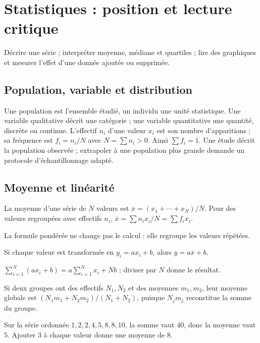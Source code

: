 \documentclass[../cours_2de.tex]{subfiles}
\begin{document}
\setcounter{chapter}{17}
\chapter{Statistiques : position et lecture critique}
\label{sec:ch18}
\begin{objectif}
Décrire une série ; interpréter moyenne, médiane et quartiles ; lire des graphiques et mesurer l'effet d'une donnée ajoutée ou supprimée.
\end{objectif}
\section{Population, variable et distribution}
Une population est l'ensemble étudié, un individu une unité statistique.
Une variable qualitative décrit une catégorie ; une variable quantitative une quantité, discrète ou continue.
L'effectif $n_i$ d'une valeur $x_i$ est son nombre d'apparitions ; sa fréquence est $f_i=n_i/N$ avec $N=\sum n_i>0$.
Ainsi $\sum f_i=1$.
Une étude décrit la population observée ; extrapoler à une population plus grande demande un protocole d'échantillonnage adapté.
\section{Moyenne et linéarité}
\begin{definition}
La moyenne d'une série de $N$ valeurs est
$\overline x=(x_1+\cdots+x_N)/N$.
Pour des valeurs regroupées avec effectifs $n_i$,
$\overline x=\sum n_ix_i/N=\sum f_ix_i$.
\end{definition}
La formule pondérée ne change pas le calcul : elle regroupe les valeurs répétées.
\begin{propriete}
Si chaque valeur est transformée en $y_i=ax_i+b$, alors
$\overline y=a\overline x+b$.
\end{propriete}
\begin{demonstration}
$\sum_{i=1}^N(ax_i+b)=a\sum_{i=1}^Nx_i+Nb$ ; diviser par $N$ donne le résultat.
\end{demonstration}
Si deux groupes ont des effectifs $N_1,N_2$ et des moyennes $m_1,m_2$, leur moyenne globale est
$(N_1m_1+N_2m_2)/(N_1+N_2)$, puisque $N_jm_j$ reconstitue la somme du groupe.
\begin{exemple}
Sur la série ordonnée $1,2,2,4,5,8,8,10$, la somme vaut $40$, donc la moyenne vaut $5$.
Ajouter $3$ à chaque valeur donne une moyenne de $8$.
\end{exemple}
\end{document}
